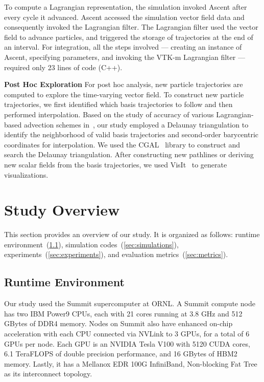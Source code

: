 \documentclass[runningheads]{llncs}
\begin{document}
To compute a Lagrangian representation, the simulation invoked Ascent after every cycle it advanced.
%
Ascent accessed the simulation vector field data and consequently invoked the Lagrangian filter.
%
The Lagrangian filter used the vector field to advance particles, and triggered the storage of trajectories at the end of an interval.
%
%
For integration, all the steps involved --- creating an instance of Ascent, specifying parameters, and invoking the VTK-m Lagrangian filter --- required only 23 lines of code (C++). %
%
%

\noindent\textbf{Post Hoc Exploration}
For post hoc analysis, new particle trajectories are computed to explore the time-varying vector field. %
%
To construct new particle trajectories, we first identified which basis trajectories to follow and then performed interpolation.
%
Based on the study of accuracy of various Lagrangian-based advection schemes in~\cite{agranovsky2015subsampling}, our study employed a Delaunay triangulation to identify the neighborhood of valid basis trajectories and second-order barycentric coordinates for interpolation.
%
We used the CGAL~\cite{fabri2011cgal} library to construct and search the Delaunay triangulation.
%
After constructing new pathlines or deriving new scalar fields from the basis trajectories, we used VisIt~\cite{childs2012visit} to generate visualizations.

\vspace{-2mm}
\section{Study Overview}
\label{sec:study}
This section provides an overview of our study. It is organized as follows: runtime environment~(\ref{sec:runtime}), simulation codes~(\ref{sec:simulations}), experiments~(\ref{sec:experiments}), and evaluation metrics~(\ref{sec:metrics}). %

\vspace{-3mm}
\subsection{Runtime Environment}
\label{sec:runtime}
Our study used the Summit supercomputer at ORNL.
%
A Summit compute node has two IBM Power9 CPUs, each with 21 cores running at 3.8 GHz and 512 GBytes of DDR4 memory.
%
Nodes on Summit also have enhanced on-chip acceleration with each CPU connected via NVLink to 3 GPUs, for a total of 6 GPUs per node.
%
Each GPU is an NVIDIA Tesla V100 with 5120 CUDA cores, 6.1 TeraFLOPS of double precision performance, and 16 GBytes of HBM2 memory.
%
Lastly, it has a Mellanox EDR 100G InfiniBand, Non-blocking Fat Tree as its interconnect topology.
\end{document}
